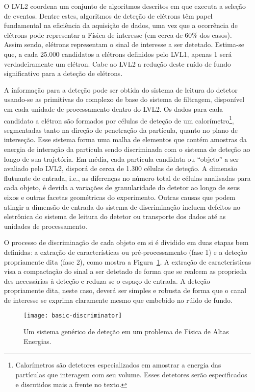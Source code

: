 O LVL2 coordena um conjunto de algoritmos descritos em  que
executa a seleção de eventos. Dentre estes, algoritmos de deteção de elétrons
têm papel fundamental na eficiência da aquisição de dados, uma vez que a
ocorrência de elétrons pode representar a Física de interesse (em cerca de
60\% dos casos). Assim sendo, elétrons representam o sinal de interesse a ser
detetado. Estima-se que, a cada 25.000 candidatos a elétrons definidos pelo
LVL1, apenas 1 será verdadeiramente um elétron. Cabe ao LVL2 a redução deste
ruído de fundo significativo para a deteção de elétrons.

A informação para a deteção pode ser obtida do sistema de leitura do detetor
usando-se as primitivas do complexo  de base do sistema de
filtragem, disponível em cada unidade de processamento dentro do LVL2. Os
dados para cada candidato a elétron são formados por células de deteção de um
calorímetro\footnote{Calorímetros são detetores especializados em amostrar a
energia das partículas que interagem com seu volume. Esses detetores serão
especificados e discutidos mais a frente no texto.}, segmentadas tanto na
direção de penetração da partícula, quanto no plano de interseção. Esse
sistema forma uma malha de elementos que contém amostras da energia de
interação da partícula sendo discriminada com o sistema de deteção ao longo
de sua trajetória. Em média, cada partícula-candidata ou ``objeto'' a ser
avaliado pelo LVL2, disporá de cerca de 1.300 células de deteção. A dimensão
flutuante de entrada, i.e., as diferenças no número total de células
analisadas para cada objeto, é devida a variações de granularidade do detetor
ao longo de seus eixos e outras facetas geométricas do experimento. Outras
causas que podem atingir a dimensão de entrada do sistema de discriminação
incluem defeitos no eletrônica do sistema de leitura do detetor ou transporte
dos dados até as unidades de processamento.

O processo de discriminação de cada objeto em si é dividido em duas etapas bem
definidas: a extração de características ou pré-processamento (fase 1) e a
deteção propriamente dita (fase 2), como mostra a
Figura~\ref{fig:intro-disc}. A extração de características visa a compactação
do sinal a ser detetado de forma que se realcem as proprieda
des necessárias à
deteção e reduza-se o espaço de entrada. A deteção propriamente dita, neste
caso, deverá ser simples e robusta de forma que o canal de interesse se
exprima claramente mesmo que embebido no rúido de fundo.

\begin{figure}
\begin{center}
\texttt{[image: basic-discriminator]}
\end{center}
\caption{Um sistema genérico de deteção em um problema de Física de Altas
Energias.}
\label{fig:intro-disc}
\end{figure}

